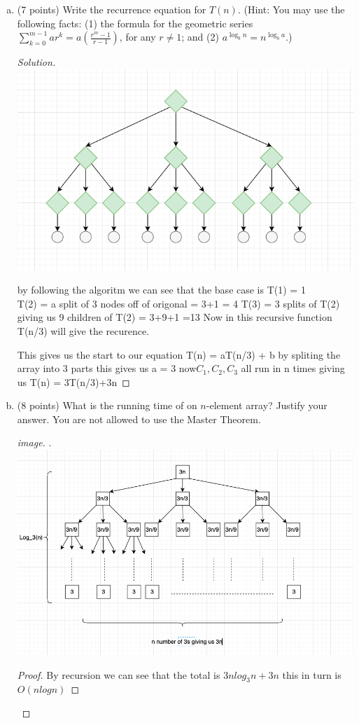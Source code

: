 \documentclass[12pt]{amsart}
\begin{document}
\pagebreak
\begin{enumerate}[(a)]

\item(7 points) Write the recurrence equation for $T(n)$. (Hint: You may use the following facts: (1) the formula for the geometric series $\sum\limits_{k=0}^{m-1} ar^k = a\left( \frac{r^m - 1}{r - 1}\right)$, for any $r \neq 1$; and (2) $a^{\log_b n} = n^{\log_b a}$.)\\

\begin{proof}[Solution]
	\includegraphics[scale=.5]{q4graph.png}
	
	by following the algoritm we can see that the base case is T(1) = 1 \\
T(2) = a split of 3 nodes off of origonal = 3+1 = 4
T(3) = 3 splits of T(2) giving us 9 children of T(2) = 3+9+1 =13
Now in this recursive function T(n/3) will give the recurence. 

This gives us the start to our equation T(n) = aT(n/3) + b
by spliting the array into 3 parts this gives us a = 3
now$ C_1,C_2,C_3$ all run in n times giving us T(n) = 3T(n/3)+3n
\end{proof}
\newpage

\item(8 points) What is the running time of \Mystery on $n$-element array? Justify your answer. You are not allowed to use the Master Theorem.
\begin{proof}[image].\\
\includegraphics[scale=.5]{q4b.png}
\begin{proof}
By recursion we can see that the total is $3nlog_3n + 3n$ this in turn is $O(nlogn)$


\end{proof}
\end{proof}
\end{enumerate}
\end{document}
